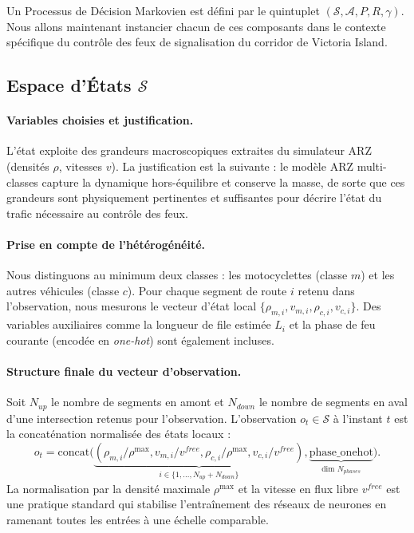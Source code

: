 Un Processus de Décision Markovien est défini par le quintuplet $(\mathcal{S}, \mathcal{A}, P, R, \gamma)$.
Nous allons maintenant instancier chacun de ces composants dans le contexte spécifique du contrôle des feux de signalisation du corridor de Victoria Island.

\subsection{Espace d'États $\mathcal{S}$}
\label{subsec:espace_etats}

\paragraph{Variables choisies et justification.}
L'état exploite des grandeurs macroscopiques extraites du simulateur ARZ (densités $\rho$, vitesses $v$). La justification est la suivante : le modèle ARZ multi-classes capture la dynamique hors-équilibre et conserve la masse, de sorte que ces grandeurs sont physiquement pertinentes et suffisantes pour décrire l'état du trafic nécessaire au contrôle des feux.

\paragraph{Prise en compte de l'hétérogénéité.}
Nous distinguons au minimum deux classes : les motocyclettes (classe $m$) et les autres véhicules (classe $c$). Pour chaque segment de route $i$ retenu dans l'observation, nous mesurons le vecteur d'état local $\{\rho_{m,i}, v_{m,i}, \rho_{c,i}, v_{c,i}\}$. Des variables auxiliaires comme la longueur de file estimée $L_i$ et la phase de feu courante (encodée en \textit{one-hot}) sont également incluses.

\paragraph{Structure finale du vecteur d'observation.}
Soit $N_{up}$ le nombre de segments en amont et $N_{down}$ le nombre de segments en aval d'une intersection retenus pour l'observation. L'observation $o_t \in \mathcal{S}$ à l'instant $t$ est la concaténation normalisée des états locaux :
\begin{equation}
o_t = \mathrm{concat}\big( \underbrace{(\rho_{m,i}/\rho^{\max}, v_{m,i}/v^{free}, \rho_{c,i}/\rho^{\max}, v_{c,i}/v^{free})}_{i \in \{1, ..., N_{up}+N_{down}\}}, \underbrace{\text{phase\_onehot}}_{\text{dim } N_{phases}} \big).
\end{equation}
La normalisation par la densité maximale $\rho^{\max}$ et la vitesse en flux libre $v^{free}$ est une pratique standard qui stabilise l'entraînement des réseaux de neurones en ramenant toutes les entrées à une échelle comparable.

